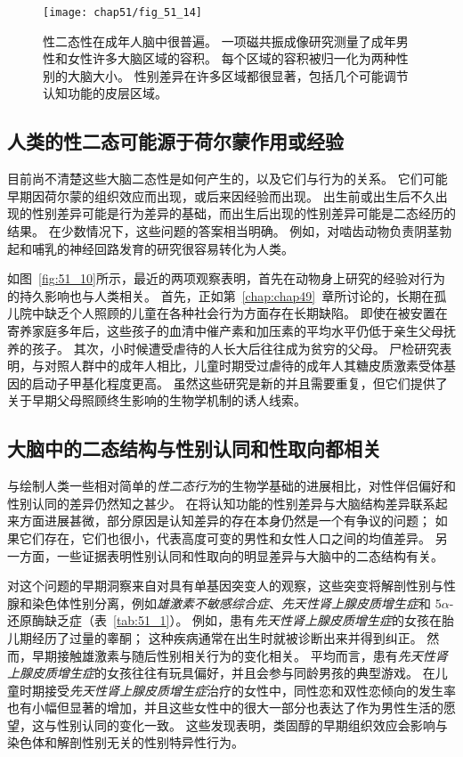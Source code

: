 \begin{figure}[htbp]
	\centering
	\texttt{[image: chap51/fig\_51\_14]}
	\caption{性二态性在成年人脑中很普遍。
		一项磁共振成像研究测量了成年男性和女性许多大脑区域的容积。
		每个区域的容积被归一化为两种性别的大脑大小。
		性别差异在许多区域都很显著，包括几个可能调节认知功能的皮层区域\cite{cahill2006sex}。 }
	\label{fig:51_14}
\end{figure}



\subsection{人类的性二态可能源于荷尔蒙作用或经验}

目前尚不清楚这些大脑二态性是如何产生的，以及它们与行为的关系。
它们可能早期因荷尔蒙的组织效应而出现，或后来因经验而出现。
出生前或出生后不久出现的性别差异可能是行为差异的基础，而出生后出现的性别差异可能是二态经历的结果。
在少数情况下，这些问题的答案相当明确。
例如，对啮齿动物负责阴茎勃起和哺乳的神经回路发育的研究很容易转化为人类。


如图~\ref{fig:51_10}所示，最近的两项观察表明，首先在动物身上研究的经验对行为的持久影响也与人类相关。
首先，正如第~\ref{chap:chap49}~章所讨论的，长期在孤儿院中缺乏个人照顾的儿童在各种社会行为方面存在长期缺陷。
即使在被安置在寄养家庭多年后，这些孩子的血清中催产素和加压素的平均水平仍低于亲生父母抚养的孩子。
其次，小时候遭受虐待的人长大后往往成为贫穷的父母。
尸检研究表明，与对照人群中的成年人相比，儿童时期受过虐待的成年人其糖皮质激素受体基因的启动子甲基化程度更高。
虽然这些研究是新的并且需要重复，但它们提供了关于早期父母照顾终生影响的生物学机制的诱人线索。



\subsection{大脑中的二态结构与性别认同和性取向都相关}

与绘制人类一些相对简单的\textit{性二态行为}的生物学基础的进展相比，对性伴侣偏好和性别认同的差异仍然知之甚少。
在将认知功能的性别差异与大脑结构差异联系起来方面进展甚微，部分原因是认知差异的存在本身仍然是一个有争议的问题；
如果它们存在，它们也很小，代表高度可变的男性和女性人口之间的均值差异。
另一方面，一些证据表明性别认同和性取向的明显差异与大脑中的二态结构有关。


对这个问题的早期洞察来自对具有单基因突变人的观察，这些突变将解剖性别与性腺和染色体性别分离，例如\textit{雄激素不敏感综合症}、\textit{先天性肾上腺皮质增生症}和 5$\alpha$-还原酶缺乏症（表~\ref{tab:51_1}）。
例如，患有\textit{先天性肾上腺皮质增生症}的女孩在胎儿期经历了过量的睾酮；
这种疾病通常在出生时就被诊断出来并得到纠正。
然而，早期接触雄激素与随后性别相关行为的变化相关。
平均而言，患有\textit{先天性肾上腺皮质增生症}的女孩往往有玩具偏好，并且会参与同龄男孩的典型游戏。
在儿童时期接受\textit{先天性肾上腺皮质增生症}治疗的女性中，同性恋和双性恋倾向的发生率也有小幅但显著的增加，并且这些女性中的很大一部分也表达了作为男性生活的愿望，这与性别认同的变化一致。
这些发现表明，类固醇的早期组织效应会影响与染色体和解剖性别无关的性别特异性行为。



